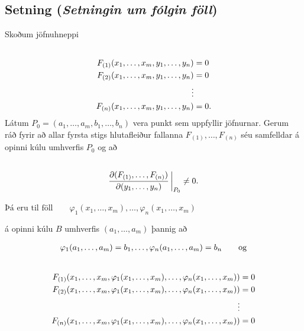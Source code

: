 \documentclass[a4paper,10pt,icelandic]{sphinxmanual}
\begin{document}
\subsection{Setning (\textit{Setningin um fólgin föll})}
\label{Kafli2:id55}\label{Kafli2:index-28}
Skoðum jöfnuhneppi
\begin{gather}
\begin{split}\displaystyle\end{split}\notag\\\begin{split}\begin{aligned}
F_{(1)}(x_1,\ldots,x_m, y_1, \ldots, y_n)&=0\\
F_{(2)}(x_1,\ldots,x_m, y_1, \ldots, y_n)&=0\\
\vdots\\
F_{(n)}(x_1,\ldots,x_m, y_1, \ldots, y_n)&=0.\end{aligned}\end{split}\notag
\end{gather}
Látum \(P_0=(a_1,\ldots, a_m, b_1,\ldots, b_n)\) vera punkt sem
uppfyllir jöfnurnar. Gerum ráð fyrir að allar fyrsta stigs hlutafleiður
fallanna \(F_{(1)},\ldots, F_{(n)}\) séu samfelldar á opinni kúlu
umhverfis \(P_0\) og að
\begin{gather}
\begin{split}\displaystyle\end{split}\notag\\\begin{split}\frac{\partial(F_{(1)}, \ldots, F_{(n)})}
{\partial( y_1, \ldots, y_n)}\,\bigg|_{P_0}\neq 0.\end{split}\notag
\end{gather}
\begin{DUlineblock}{0em}
\item[] \(\text{Þá eru til föll} \qquad \varphi_1(x_1,\ldots,x_m),\ldots,\varphi_n(x_1,\ldots,x_m)\)
\item[] á opinni kúlu \(B\) umhverfis \((a_1,\ldots,a_m)\) þannig að
\end{DUlineblock}
\begin{gather}
\begin{split}\displaystyle \varphi_1(a_1,\ldots,a_m)=b_1,\ldots,\varphi_n(a_1,\ldots,a_m)=b_n \qquad \text{og}\end{split}\notag
\end{gather}\begin{gather}
\begin{split}\displaystyle\end{split}\notag\\\begin{split}\begin{aligned}
F_{(1)}(x_1,\ldots,x_m, \varphi_1(x_1,\ldots,x_m),\ldots,
\varphi_n(x_1,\ldots,x_m))&=0\\
F_{(2)}(x_1,\ldots,x_m, \varphi_1(x_1,\ldots,x_m),\ldots,
\varphi_n(x_1,\ldots,x_m))&=0\\
\vdots\\
F_{(n)}(x_1,\ldots,x_m, \varphi_1(x_1,\ldots,x_m),\ldots,
\varphi_n(x_1,\ldots,x_m))&=0\end{aligned}\end{split}\notag
\end{gather}
\end{document}
